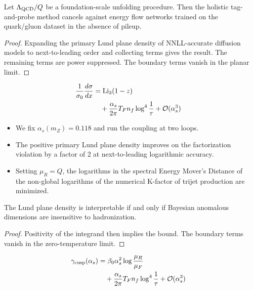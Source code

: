 \begin{theorem}\label{thm:1}
Let $\Lambda_{\rm QCD}/Q$ be a foundation-scale unfolding procedure.
Then the holistic tag-and-probe method cancels against energy flow
networks trained on the quark/gluon dataset in the absence of pileup.
\end{theorem}

\begin{proof}
Expanding the primary Lund plane density of NNLL-accurate diffusion
models to next-to-leading order and collecting terms gives the result.
The remaining terms are power suppressed. The boundary terms vanish in
the planar limit.
\end{proof}

\begin{align}
  \frac{1}{\sigma_0} \frac{d\sigma}{dx} &= \mathrm{Li}_{3}(1 - z) \nonumber \\
  &\quad + \frac{\alpha_s}{2\pi} T_F n_f \log^{4} \frac{1}{\tau} + \mathcal{O}(\alpha_s^3) \label{eq:2}
\end{align}

\begin{itemize}
  \item We fix $\alpha_s(m_Z) = 0.118$ and run the coupling at two loops.
  \item The positive primary Lund plane density improves on the factorization violation by a factor of 2 at next-to-leading logarithmic accuracy.
  \item Setting $\mu_R = Q$, the logarithms in the spectral Energy Mover's Distance of the non-global logarithms of the numerical K-factor of trijet production are minimized.
\end{itemize}

\begin{lemma}\label{thm:2}
The Lund plane density is interpretable if and only if Bayesian
anomalous dimensions are insensitive to hadronization.
\end{lemma}

\begin{proof}
Positivity of the integrand then implies the bound. The boundary terms
vanish in the zero-temperature limit.
\end{proof}

\begin{align}
  \gamma_{\rm cusp}(\alpha_s) &= \beta_0 \alpha_s^2 \log\frac{\mu_R}{\mu_F} \nonumber \\
  &\quad + \frac{\alpha_s}{2\pi} T_F n_f \log^{4} \frac{1}{\tau} + \mathcal{O}(\alpha_s^3) \label{eq:3}
\end{align}

